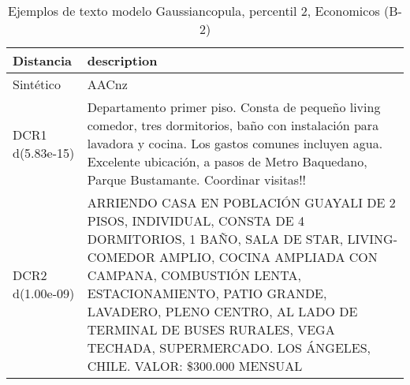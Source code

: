 \begin{table}[H]
\centering
\fontsize{10}{14}\selectfont
\caption{Ejemplos de texto modelo Gaussiancopula, percentil 2, Economicos (B-2)}
\label{table-example-economicos-b-2-gaussiancopula-2p-text}
\begin{tabular}{|l|m{35em}|}
\hline
\rowcolor[gray]{0.8}
Distancia & description \\
\hline Sintético & AACnz \\
\hline DCR1 d(5.83e-15) & Departamento primer piso.
Consta de peque\~no living comedor, tres dormitorios, ba\~no con instalaci\'on para lavadora y cocina.
Los gastos comunes incluyen agua.
Excelente ubicaci\'on, a pasos de Metro Baquedano, Parque Bustamante.
Coordinar visitas!! \\
\hline DCR2 d(1.00e-09) & ARRIENDO CASA EN POBLACI\'ON GUAYALI DE 2 PISOS, INDIVIDUAL, CONSTA DE 4 DORMITORIOS, 1 BA\~NO, SALA DE STAR, LIVING-COMEDOR AMPLIO, COCINA AMPLIADA CON CAMPANA, COMBUSTI\'ON LENTA, ESTACIONAMIENTO, PATIO GRANDE, LAVADERO, PLENO CENTRO, AL LADO DE TERMINAL DE BUSES RURALES, VEGA TECHADA, SUPERMERCADO. LOS \'ANGELES, CHILE.
VALOR: \$300.000 MENSUAL
 \\
\hline
\end{tabular}
\end{table}
